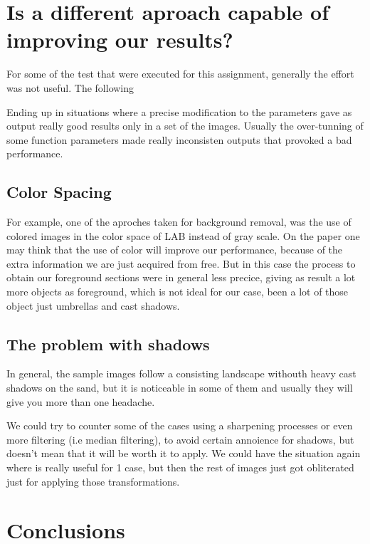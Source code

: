 \documentclass[11pt]{article}
\begin{document}
\section{Is a different aproach capable of improving our results?}

For some of the test that were executed for this assignment, generally the effort was not useful. The following  


Ending up in situations where a precise modification to the parameters gave as output really good results only in a set of the images. Usually the over-tunning of some function parameters made really inconsisten outputs that provoked a bad performance.  


\subsection*{Color Spacing}
 For example, one of the aproches taken for background removal, was the use of colored images in the color space of LAB  instead of gray scale. On the paper one may think that the use of color will improve our performance, because of the extra information we are just acquired from free. But in this case the process to obtain our foreground sections were in general less precice, giving as result a lot more objects as foreground, which is not ideal for our case, been a lot of those object just umbrellas and cast shadows.\newline

\subsection*{The problem with shadows}

In general, the sample images follow a consisting landscape withouth heavy cast shadows on the sand, but it is noticeable in some of them and usually they will give you more than one headache.\newline 

We could try to counter some of the cases using a sharpening processes or even more filtering (i.e median filtering), to avoid certain annoience for shadows, but doesn't mean that it will be worth it to apply. We could have the situation again where is really useful for 1 case, but then the rest of images just got obliterated just for applying those transformations.



\section{Conclusions}
\end{document}
